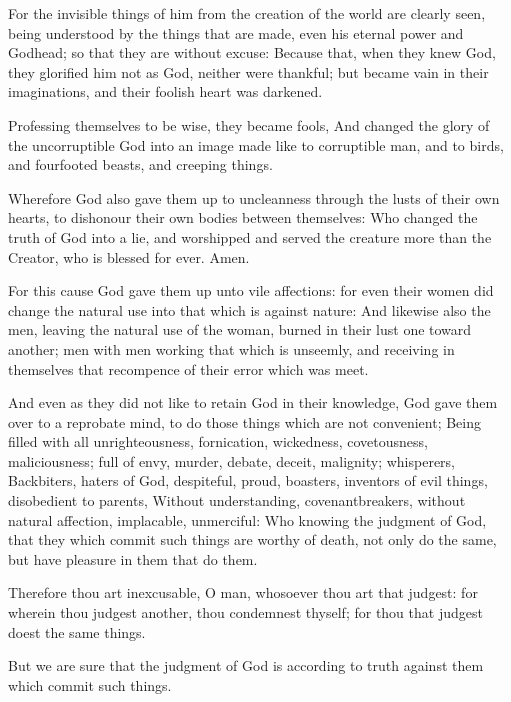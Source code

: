 \Verse For the invisible things of him from the creation of the world are clearly seen, being understood by the things that are made, even his eternal power and Godhead; so that they are without excuse: \Verse Because that, when they knew God, they glorified him not as God, neither were thankful; but became vain in their imaginations, and their foolish heart was darkened.

\Verse Professing themselves to be wise, they became fools, \Verse And changed the glory of the uncorruptible God into an image made like to corruptible man, and to birds, and fourfooted beasts, and creeping things.

\Verse Wherefore God also gave them up to uncleanness through the lusts of their own hearts, to dishonour their own bodies between themselves: \Verse Who changed the truth of God into a lie, and worshipped and served the creature more than the Creator, who is blessed for ever.  Amen.

\Verse For this cause God gave them up unto vile affections: for even their women did change the natural use into that which is against nature: \Verse And likewise also the men, leaving the natural use of the woman, burned in their lust one toward another; men with men working that which is unseemly, and receiving in themselves that recompence of their error which was meet.

\Verse And even as they did not like to retain God in their knowledge, God gave them over to a reprobate mind, to do those things which are not convenient; \Verse Being filled with all unrighteousness, fornication, wickedness, covetousness, maliciousness; full of envy, murder, debate, deceit, malignity; whisperers, \Verse Backbiters, haters of God, despiteful, proud, boasters, inventors of evil things, disobedient to parents, \Verse Without understanding, covenantbreakers, without natural affection, implacable, unmerciful: \Verse Who knowing the judgment of God, that they which commit such things are worthy of death, not only do the same, but have pleasure in them that do them.


\Chapter
\Verse Therefore thou art inexcusable, O man, whosoever thou art that judgest: for wherein thou judgest another, thou condemnest thyself; for thou that judgest doest the same things.

\Verse But we are sure that the judgment of God is according to truth against them which commit such things.


